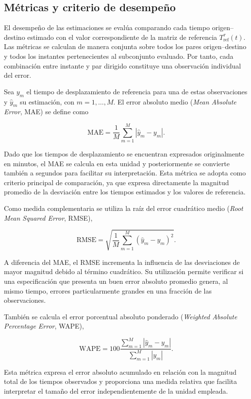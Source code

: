 \documentclass[11pt]{article}
\begin{document}
\subsection{Métricas y criterio de desempeño}

El desempeño de las estimaciones se evalúa comparando cada tiempo origen--destino estimado con el valor correspondiente de la matriz de referencia $T^{\tau}_{\mathrm{ref}}(t)$. Las métricas se calculan de manera conjunta sobre todos los pares origen--destino y todos los instantes pertenecientes al subconjunto evaluado. Por tanto, cada combinación entre instante y par dirigido constituye una observación individual del error.

Sea $y_m$ el tiempo de desplazamiento de referencia para una de estas observaciones y $\widehat{y}_m$ su estimación, con $m=1,\ldots,M$. El error absoluto medio (\textit{Mean Absolute Error}, MAE) se define como

\[
\mathrm{MAE}
=
\frac{1}{M}
\sum_{m=1}^{M}
\left|
\widehat{y}_m-y_m
\right|.
\]

Dado que los tiempos de desplazamiento se encuentran expresados originalmente en minutos, el MAE se calcula en esta unidad y posteriormente se convierte también a segundos para facilitar su interpretación. Esta métrica se adopta como criterio principal de comparación, ya que expresa directamente la magnitud promedio de la desviación entre los tiempos estimados y los valores de referencia.

Como medida complementaria se utiliza la raíz del error cuadrático medio (\textit{Root Mean Squared Error}, RMSE),

\[
\mathrm{RMSE}
=
\sqrt{
\frac{1}{M}
\sum_{m=1}^{M}
\left(
\widehat{y}_m-y_m
\right)^2
}.
\]

A diferencia del MAE, el RMSE incrementa la influencia de las desviaciones de mayor magnitud debido al término cuadrático. Su utilización permite verificar si una especificación que presenta un buen error absoluto promedio genera, al mismo tiempo, errores particularmente grandes en una fracción de las observaciones.

También se calcula el error porcentual absoluto ponderado (\textit{Weighted Absolute Percentage Error}, WAPE),

\[
\mathrm{WAPE}
=
100
\frac{
\sum_{m=1}^{M}
\left|
\widehat{y}_m-y_m
\right|
}{
\sum_{m=1}^{M}
|y_m|
}.
\]

Esta métrica expresa el error absoluto acumulado en relación con la magnitud total de los tiempos observados y proporciona una medida relativa que facilita interpretar el tamaño del error independientemente de la unidad empleada.
\end{document}
